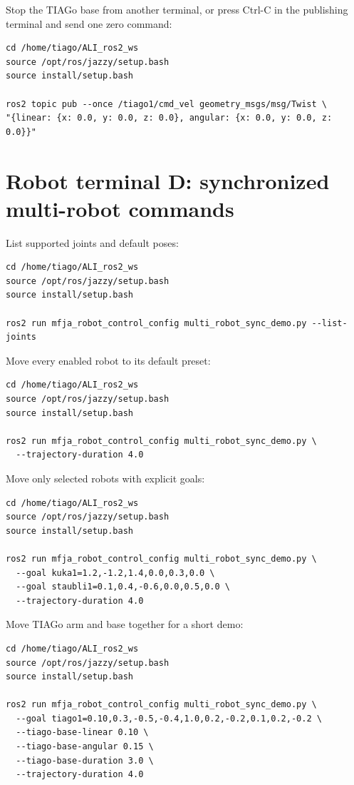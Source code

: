 \documentclass[12pt,a4paper]{report}
\begin{document}
Stop the TIAGo base from another terminal, or press Ctrl-C in the publishing
terminal and send one zero command:

\begin{lstlisting}[style=terminalcode]
cd /home/tiago/ALI_ros2_ws
source /opt/ros/jazzy/setup.bash
source install/setup.bash

ros2 topic pub --once /tiago1/cmd_vel geometry_msgs/msg/Twist \
"{linear: {x: 0.0, y: 0.0, z: 0.0}, angular: {x: 0.0, y: 0.0, z: 0.0}}"
\end{lstlisting}

\section{Robot terminal D: synchronized multi-robot commands}

List supported joints and default poses:

\begin{lstlisting}[style=terminalcode]
cd /home/tiago/ALI_ros2_ws
source /opt/ros/jazzy/setup.bash
source install/setup.bash

ros2 run mfja_robot_control_config multi_robot_sync_demo.py --list-joints
\end{lstlisting}

Move every enabled robot to its default preset:

\begin{lstlisting}[style=terminalcode]
cd /home/tiago/ALI_ros2_ws
source /opt/ros/jazzy/setup.bash
source install/setup.bash

ros2 run mfja_robot_control_config multi_robot_sync_demo.py \
  --trajectory-duration 4.0
\end{lstlisting}

Move only selected robots with explicit goals:

\begin{lstlisting}[style=terminalcode]
cd /home/tiago/ALI_ros2_ws
source /opt/ros/jazzy/setup.bash
source install/setup.bash

ros2 run mfja_robot_control_config multi_robot_sync_demo.py \
  --goal kuka1=1.2,-1.2,1.4,0.0,0.3,0.0 \
  --goal staubli1=0.1,0.4,-0.6,0.0,0.5,0.0 \
  --trajectory-duration 4.0
\end{lstlisting}

Move TIAGo arm and base together for a short demo:

\begin{lstlisting}[style=terminalcode]
cd /home/tiago/ALI_ros2_ws
source /opt/ros/jazzy/setup.bash
source install/setup.bash

ros2 run mfja_robot_control_config multi_robot_sync_demo.py \
  --goal tiago1=0.10,0.3,-0.5,-0.4,1.0,0.2,-0.2,0.1,0.2,-0.2 \
  --tiago-base-linear 0.10 \
  --tiago-base-angular 0.15 \
  --tiago-base-duration 3.0 \
  --trajectory-duration 4.0
\end{lstlisting}
\end{document}

